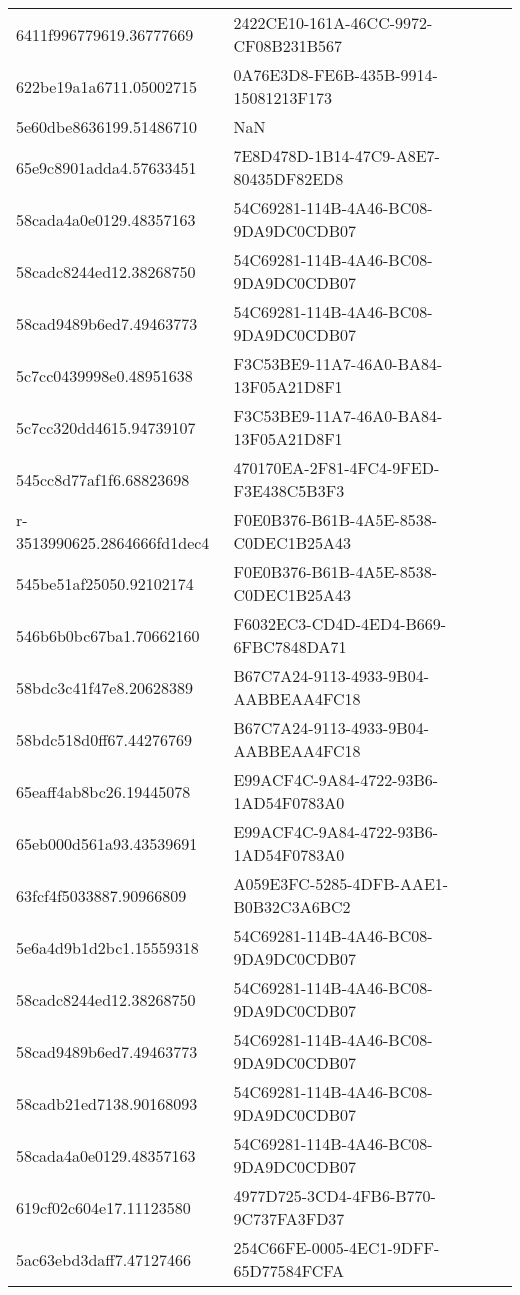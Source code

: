\begin{tabular}{ll}
6411f996779619.36777669 & 2422CE10-161A-46CC-9972-CF08B231B567 \\
622be19a1a6711.05002715 & 0A76E3D8-FE6B-435B-9914-15081213F173 \\
5e60dbe8636199.51486710 & NaN \\
65e9c8901adda4.57633451 & 7E8D478D-1B14-47C9-A8E7-80435DF82ED8 \\
58cada4a0e0129.48357163 & 54C69281-114B-4A46-BC08-9DA9DC0CDB07 \\
58cadc8244ed12.38268750 & 54C69281-114B-4A46-BC08-9DA9DC0CDB07 \\
58cad9489b6ed7.49463773 & 54C69281-114B-4A46-BC08-9DA9DC0CDB07 \\
5c7cc0439998e0.48951638 & F3C53BE9-11A7-46A0-BA84-13F05A21D8F1 \\
5c7cc320dd4615.94739107 & F3C53BE9-11A7-46A0-BA84-13F05A21D8F1 \\
545cc8d77af1f6.68823698 & 470170EA-2F81-4FC4-9FED-F3E438C5B3F3 \\
r-3513990625.2864666fd1dec4 & F0E0B376-B61B-4A5E-8538-C0DEC1B25A43 \\
545be51af25050.92102174 & F0E0B376-B61B-4A5E-8538-C0DEC1B25A43 \\
546b6b0bc67ba1.70662160 & F6032EC3-CD4D-4ED4-B669-6FBC7848DA71 \\
58bdc3c41f47e8.20628389 & B67C7A24-9113-4933-9B04-AABBEAA4FC18 \\
58bdc518d0ff67.44276769 & B67C7A24-9113-4933-9B04-AABBEAA4FC18 \\
65eaff4ab8bc26.19445078 & E99ACF4C-9A84-4722-93B6-1AD54F0783A0 \\
65eb000d561a93.43539691 & E99ACF4C-9A84-4722-93B6-1AD54F0783A0 \\
63fcf4f5033887.90966809 & A059E3FC-5285-4DFB-AAE1-B0B32C3A6BC2 \\
5e6a4d9b1d2bc1.15559318 & 54C69281-114B-4A46-BC08-9DA9DC0CDB07 \\
58cadc8244ed12.38268750 & 54C69281-114B-4A46-BC08-9DA9DC0CDB07 \\
58cad9489b6ed7.49463773 & 54C69281-114B-4A46-BC08-9DA9DC0CDB07 \\
58cadb21ed7138.90168093 & 54C69281-114B-4A46-BC08-9DA9DC0CDB07 \\
58cada4a0e0129.48357163 & 54C69281-114B-4A46-BC08-9DA9DC0CDB07 \\
619cf02c604e17.11123580 & 4977D725-3CD4-4FB6-B770-9C737FA3FD37 \\
5ac63ebd3daff7.47127466 & 254C66FE-0005-4EC1-9DFF-65D77584FCFA \\

\end{tabular}
